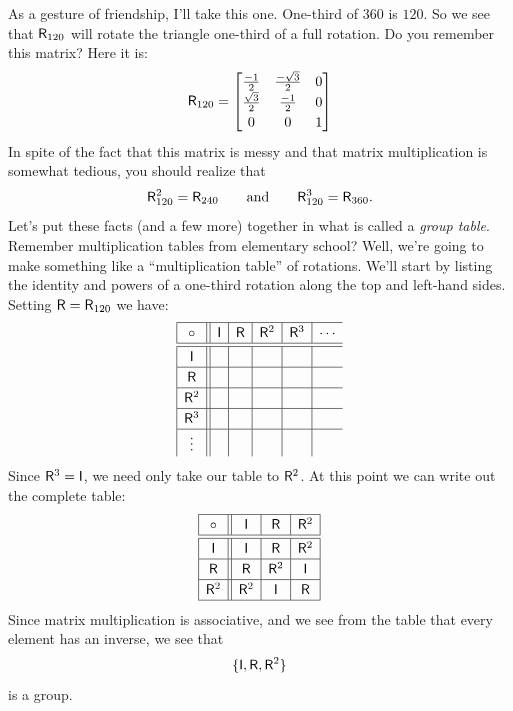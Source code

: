 As a gesture of friendship, I'll take this one. One-third of $360$ is
$120$. So we see that $\mathsf{R}_{120}$ will rotate the triangle one-third
of a full rotation. Do you remember this matrix? Here it is:
\[
\mat{R}_{120} =
\begin{bmatrix}
\frac{-1}{2} & \frac{-\sqrt{3}}{2} & 0\\
\frac{\sqrt{3}}{2} & \frac{-1}{2} & 0\\
0 & 0 & 1
\end{bmatrix}
\]
In spite of the fact that this matrix is messy and that matrix
multiplication is somewhat tedious, you should realize that
\[
\mathsf{R}_{120}^2 = \mathsf{R}_{240}\qquad\text{and}\qquad\mathsf{R}_{120}^3 = \mathsf{R}_{360}.
\]
Let's put these facts (and a few more) together in what is called a
\textit{group table}. Remember multiplication
tables from elementary school? Well, we're going to make something
like a ``multiplication table'' of rotations. We'll start by listing
the identity and powers of a one-third rotation along the top and
left-hand sides. Setting $\mathsf{R} = \mathsf{R}_{120}$ we have:
\[
{
\renewcommand{\arraystretch}{1.2}
\begin{array}{|c||c|c|c|c|c}
\hline 
\circ & \mat{I} & \mat{R} & \mat{R}^2 & \mat{R}^3 & \cdots \\ \hline\hline 
\mat{I} & & & & &  \\ \hline 
\mat{R} & & & & &  \\ \hline 
\mat{R}^2 &  & & & & \\ \hline
\mat{R}^3 &  & & & & \\ \hline
\vdots &  & & & & \\ 
\end{array}}
\]
Since $\mathsf{R}^3 = \mathsf{I}$, we need only take our table to
$\mathsf{R}^2$. At this point we can write out the complete table:
\[
{
\renewcommand{\arraystretch}{1.2}
\begin{array}{| c || c | c | c |}
\hline 
\circ & \mat{I} & \mat{R} & \mat{R}^2 \\ \hline\hline 
\mat{I} & \mat{I} & \mat{R} & \mat{R}^2 \\ \hline 
\mat{R} & \mat{R} & \mat{R}^2 & \mat{I} \\ \hline 
\mat{R}^2 & \mat{R}^2 & \mat{I} & \mat{R} \\ \hline
\end{array}}
\]
Since matrix multiplication is associative, and we see from the table
that every element has an inverse, we see that 
\[
\{\mathsf{I}, \mathsf{R}, \mathsf{R}^2\}
\]
is a group.

